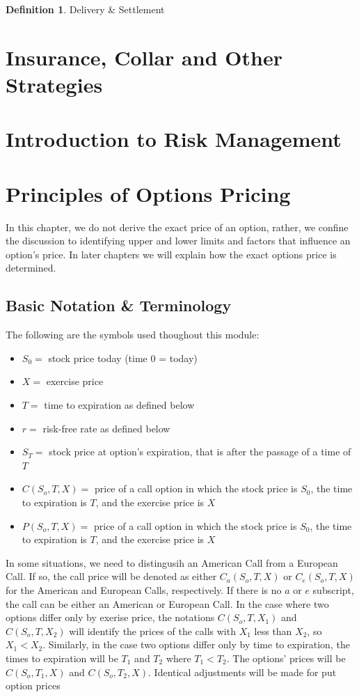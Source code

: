 \documentclass{book}
\theoremstyle{definition}
\newtheorem{definition}{Definition}[section]
\theoremstyle{remark}
\begin{document}
    \begin{definition}{Delivery \& Settlement}
    
    \end{definition}
\newpage
\section{Insurance, Collar and Other Strategies}
\section{Introduction to Risk Management}
\section{Principles of Options Pricing}

In this chapter, we do not derive the exact price of an option, rather, we confine the discussion to identifying upper and lower limits and factors that influence an option's price. In later chapters we will explain how the exact options price is determined.  
   
    \subsection{Basic Notation \& Terminology}
        The following are the symbols used thoughout this module:
            \begin{itemize}
                \item $S_0 =$ stock price today (time 0 = today)
                \item $X =$ exercise price
                \item $T =$ time to expiration as defined below
                \item $r =$ risk-free rate as defined below
                \item $S_T =$ stock price at option's expiration, that is after the passage of a time of $T$
                \item $C(S_o, T, X) =$ price of a call option in which the stock price is $S_0$, the time to expiration is $T$, and the exercise price is $X$
                \item $P(S_o, T, X) =$ price of a call option in which the stock price is $S_0$, the time to expiration is $T$, and the exercise price is $X$
            \end{itemize}
        In some situations, we need to distingusih an American Call from a European Call. If so, the call price will be denoted as either $C_a(S_o, T, X)$ or $C_e(S_o, T, X)$ for the American and European Calls, respectively. If there is no $a$ or $e$ subscript, the call can be either an American or European Call. In the case where two options differ only by exerise price, the notations $C(S_o, T, X_1)$ and $C(S_o, T, X_2)$ will identify the prices of the calls with $X_1$ less than $X_2$, so $X_1 < X_2$. Similarly, in the case two options differ only by time to expiration, the times to expiration will be $T_1$ and $T_2$ where $T_1<T_2$. The options' prices will be $C(S_o, T_1, X)$ and $C(S_o, T_2, X)$. Identical adjustments will be made for put option prices
        
\end{document}

